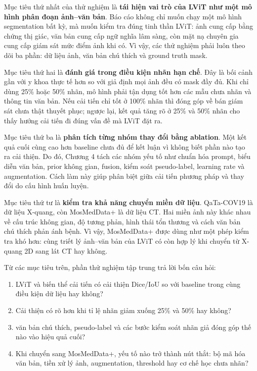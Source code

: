 Mục tiêu thứ nhất của thử nghiệm là \textbf{tái hiện vai trò của LViT như một mô hình phân đoạn ảnh--văn bản}. Báo cáo không chỉ muốn chạy một mô hình segmentation bất kỳ, mà muốn kiểm tra đúng tinh thần LViT: ảnh cung cấp bằng chứng thị giác, văn bản cung cấp ngữ nghĩa lâm sàng, còn mặt nạ chuyên gia cung cấp giám sát mức điểm ảnh khi có. Vì vậy, các thử nghiệm phải luôn theo dõi ba phần: dữ liệu ảnh, văn bản chú thích và ground truth mask.

Mục tiêu thứ hai là \textbf{đánh giá trong điều kiện nhãn hạn chế}. Đây là bối cảnh gần với y khoa thực tế hơn so với giả định mọi ảnh đều có mask đầy đủ. Khi chỉ dùng 25\% hoặc 50\% nhãn, mô hình phải tận dụng tốt hơn các mẫu chưa nhãn và thông tin văn bản. Nếu cải tiến chỉ tốt ở 100\% nhãn thì đóng góp về bán giám sát chưa thật thuyết phục; ngược lại, kết quả tăng rõ ở 25\% và 50\% nhãn cho thấy hướng cải tiến đi đúng vấn đề mà LViT đặt ra.

Mục tiêu thứ ba là \textbf{phân tích từng nhóm thay đổi bằng ablation}. Một kết quả cuối cùng cao hơn baseline chưa đủ để kết luận vì không biết phần nào tạo ra cải thiện. Do đó, Chương 4 tách các nhóm yếu tố như chuẩn hóa prompt, biểu diễn văn bản, prior không gian, fusion, kiểm soát pseudo-label, learning rate và augmentation. Cách làm này giúp phân biệt giữa cải tiến phương pháp và thay đổi do cấu hình huấn luyện.

Mục tiêu thứ tư là \textbf{kiểm tra khả năng chuyển miền dữ liệu}. QaTa-COV19 là dữ liệu X-quang, còn MosMedData+ là dữ liệu CT. Hai miền ảnh này khác nhau về cấu trúc không gian, độ tương phản, hình thái tổn thương và cách văn bản chú thích phản ánh bệnh. Vì vậy, MosMedData+ được dùng như một phép kiểm tra khó hơn: cùng triết lý ảnh--văn bản của LViT có còn hợp lý khi chuyển từ X-quang 2D sang lát CT hay không.

Từ các mục tiêu trên, phần thử nghiệm tập trung trả lời bốn câu hỏi:
\begin{enumerate}[label=(\arabic*)]
  \item LViT và biến thể cải tiến có cải thiện Dice/IoU so với baseline trong cùng điều kiện dữ liệu hay không?
  \item Cải thiện có rõ hơn khi tỉ lệ nhãn giảm xuống 25\% và 50\% hay không?
  \item văn bản chú thích, pseudo-label và các bước kiểm soát nhãn giả đóng góp thế nào vào hiệu quả cuối?
  \item Khi chuyển sang MosMedData+, yếu tố nào trở thành nút thắt: bộ mã hóa văn bản, tiền xử lý ảnh, augmentation, threshold hay cơ chế học chưa nhãn?
\end{enumerate}

